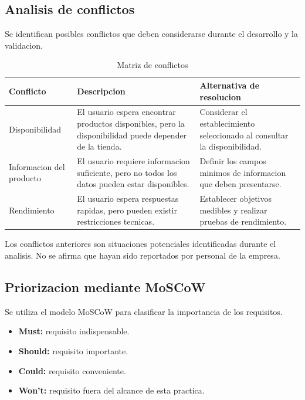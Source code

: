 \documentclass[11pt,a4paper]{article}
\begin{document}
\subsection{Analisis de conflictos}

Se identifican posibles conflictos que deben
considerarse durante el desarrollo y la validacion.

\begin{table}[H]
\centering
\caption{Matriz de conflictos}
\small
\begin{tabularx}{\textwidth}{p{3cm}YY}
\toprule
\textbf{Conflicto} &
\textbf{Descripcion} &
\textbf{Alternativa de resolucion} \\
\midrule

Disponibilidad &
El usuario espera encontrar productos disponibles,
pero la disponibilidad puede depender de la tienda. &
Considerar el establecimiento seleccionado al
consultar la disponibilidad. \\

Informacion del producto &
El usuario requiere informacion suficiente,
pero no todos los datos pueden estar disponibles. &
Definir los campos minimos de informacion
que deben presentarse. \\

Rendimiento &
El usuario espera respuestas rapidas, pero
pueden existir restricciones tecnicas. &
Establecer objetivos medibles y realizar
pruebas de rendimiento. \\

\bottomrule
\end{tabularx}
\end{table}

Los conflictos anteriores son situaciones potenciales
identificadas durante el analisis. No se afirma que
hayan sido reportados por personal de la empresa.

\subsection{Priorizacion mediante MoSCoW}

Se utiliza el modelo MoSCoW para clasificar
la importancia de los requisitos.

\begin{itemize}
    \item \textbf{Must:} requisito indispensable.
    \item \textbf{Should:} requisito importante.
    \item \textbf{Could:} requisito conveniente.
    \item \textbf{Won't:} requisito fuera del alcance
    de esta practica.
\end{itemize}
\end{document}
